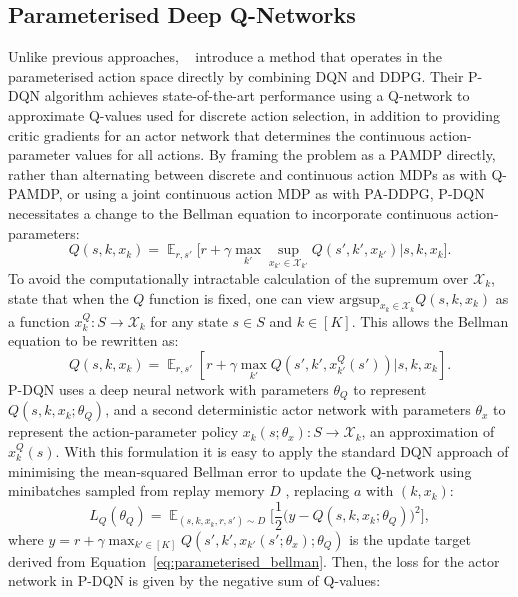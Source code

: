 \documentclass{article}
\newcommand{\Expec}{\displaystyle \mathbb{E}}
\def\PDQN*{P\nobreakdash-DQN}
\def\QPAMDP*{Q\nobreakdash-PAMDP}
\def\PADDPG*{PA\nobreakdash-DDPG}
\newcommand{\citet}[1]
{\citeauthor{#1}~\shortcite{#1}}
\begin{document}
\subsection{Parameterised Deep Q-Networks}
Unlike previous approaches, \citet{xiong2018} introduce a method that operates in the parameterised action space directly by combining DQN and DDPG. Their \PDQN* algorithm achieves state-of-the-art performance using a Q-network to approximate Q-values used for discrete action selection, in addition to providing critic gradients for an actor network that determines the continuous action-parameter values for all actions.
By framing the problem as a PAMDP directly, rather than alternating between discrete and continuous action MDPs as with \QPAMDP*, or using a joint continuous action MDP as with \PADDPG*, \PDQN* necessitates a change to the Bellman equation to incorporate continuous action-parameters:
\begin{equation}
Q(s, k, x_k) = \mathop{\Expec}_{r,s'}\Big[r + \gamma \max_{k'}\sup_{x_{k'}\in\mathcal{X}_{k'}}Q(s',k',x_{k'})\Big|s,k,x_k\Big].\end{equation}
To avoid the computationally intractable calculation of the supremum over $\mathcal{X}_k$, \citet{xiong2018} state that when the $Q$ function is fixed, one can view $\text{argsup}_{x_k\in\mathcal{X}_k}Q(s,k,x_k)$ as a function $x_k^Q : S \to \mathcal{X}_k$ for any state $s\in S$ and $k \in [K]$. This allows the Bellman equation to be rewritten as:
\begin{equation}\label{eq:parameterised_bellman}
Q(s, k, x_k) = \mathop{\Expec}_{r,s'}\left[r + \gamma \max_{k'}Q(s',k',x_{k'}^Q(s'))\Big|s,k,x_k\right].
\end{equation}
\PDQN* uses a deep neural network with parameters $\theta_Q$ to represent $Q(s,k,x_k;\theta_Q)$, and a second deterministic actor network with parameters $\theta_x$ to represent the action-parameter policy $x_k(s;\theta_x) : S \to \mathcal{X}_k$, an approximation of $x_k^Q(s)$. With this formulation it is easy to apply the standard DQN approach of minimising the mean-squared Bellman error to update the Q-network using minibatches sampled from replay memory $D$ \cite{mnih2015}, replacing $a$ with $(k, x_k)$:
\begin{equation}\label{eq:pdqn_qnetwork_loss}
L_Q(\theta_Q) = \mathop{\Expec}_{(s,k,x_k,r,s')\sim D}\Big[\frac{1}{2}\big(y - Q(s,k,x_k;\theta_Q)\big)^2\Big],
\end{equation}
where $y = r + \gamma\max_{k' \in [K]} Q(s',k', x_{k'}(s';\theta_x); \theta_Q)$ is the update target derived from Equation~\eqref{eq:parameterised_bellman}. Then, the loss for the actor network in \PDQN* is given by the negative sum of Q-values:
\end{document}
